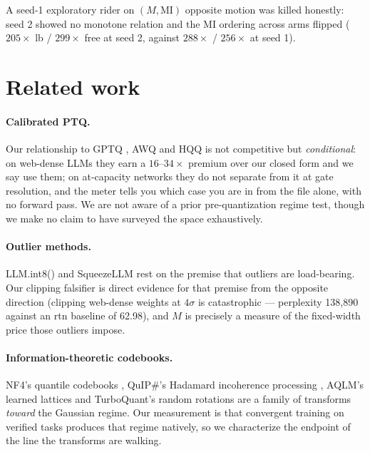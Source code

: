 \documentclass[11pt]{article}
\begin{document}
A seed-1 exploratory rider on $(M, \text{MI})$ opposite motion was killed
honestly: seed 2 showed no monotone relation and the MI ordering across arms
flipped ($205\times$ lb / $299\times$ free at seed 2, against $288\times$ /
$256\times$ at seed 1). %

\section{Related work}
\label{sec:related}

\paragraph{Calibrated PTQ.}
Our relationship to GPTQ \cite{gptq}, AWQ \cite{awq} and HQQ \cite{hqq} is not competitive but \emph{conditional}: on web-dense LLMs they earn
a $16$--$34\times$ premium over our closed form and we say use them; on
at-capacity networks they do not separate from it at gate resolution, and the
meter tells you which case you are in from the file alone, with no forward pass.
We are not aware of a prior pre-quantization regime test, though we make no claim
to have surveyed the space exhaustively.

\paragraph{Outlier methods.}
LLM.int8() \cite{llmint8} and SqueezeLLM \cite{squeezellm} rest on the premise
that outliers are load-bearing. Our clipping falsifier is direct evidence for
that premise from the opposite direction (clipping web-dense weights at
$4\sigma$ is catastrophic --- perplexity 138{,}890 against an rtn baseline of
62.98), %
and $M$ is precisely a measure of the fixed-width price those outliers impose.

\paragraph{Information-theoretic codebooks.}
NF4's quantile codebooks \cite{qlora}, QuIP\#'s Hadamard incoherence processing
\cite{quipsharp}, AQLM's learned lattices \cite{aqlm} and TurboQuant's random
rotations \cite{turboquant} are a family of transforms \emph{toward} the Gaussian
regime. Our measurement is that convergent training on verified tasks produces
that regime natively, so we characterize the endpoint of the line the transforms
are walking.
\end{document}
